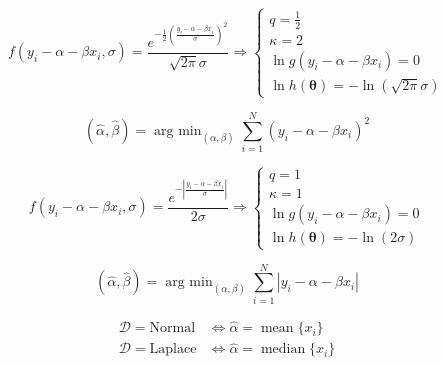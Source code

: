 \begin{equation}
    f(y_i-\alpha-\beta x_i,\sigma)=\frac{e^{-\frac{1}{2}\left(\frac{y_i-\alpha-\beta x_i}{\sigma}\right)^2}}{\sqrt{2\pi}\sigma}\Rightarrow
\begin{cases}
q=\frac{1}{2}\\
\kappa=2\\
\ln g(y_i-\alpha-\beta x_i)=0\\
\ln h(\boldsymbol{\theta})=-\ln(\sqrt{2\pi}\sigma)
\end{cases}
\end{equation}

\begin{equation}
(\hat{\alpha},\hat{\beta})=\mathop{\mathrm{arg~min}}_{(\alpha,\beta)}\sum_{i=1}^N(y_i-\alpha-\beta x_i)^2
\end{equation}

\begin{equation}
    f(y_i-\alpha-\beta x_i,\sigma)=\frac{e^{-\left|\frac{y_i-\alpha-\beta x_i}{\sigma}\right|}}{2\sigma}\Rightarrow
\begin{cases}
q=1\\
\kappa=1\\
\ln g(y_i-\alpha-\beta x_i)=0\\
\ln h(\boldsymbol{\theta})=-\ln(2\sigma)
\end{cases}
\end{equation}

\begin{equation}
(\hat{\alpha},\hat{\beta})=\mathop{\mathrm{arg~min}}_{(\alpha,\beta)}\sum_{i=1}^N|y_i-\alpha-\beta x_i|
\end{equation}

\begin{align}
    \mathcal{D}=\mathrm{Normal}&\Leftrightarrow\hat{\alpha}=
\mathop{\mathrm{mean}}\{x_i\}\\
\mathcal{D}=\mathrm{Laplace}&\Leftrightarrow\hat{\alpha}=
\mathop{\mathrm{median}}\{x_i\}
\end{align}

